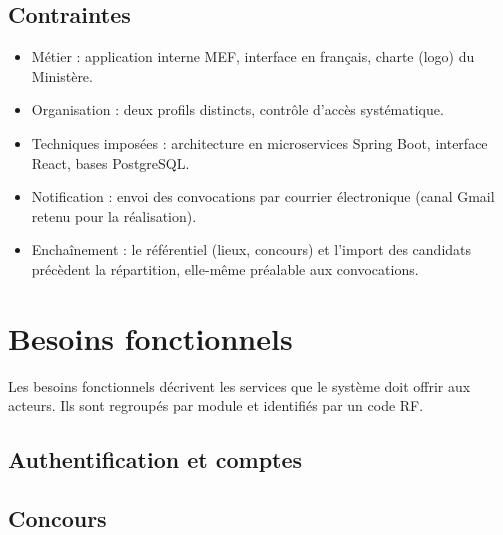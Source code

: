 \begin{onehalfspace}
\subsection{Contraintes}

\begin{itemize}
  \item Métier : application interne MEF, interface en français, charte (logo) du Ministère.
  \item Organisation : deux profils distincts, contrôle d'accès systématique.
  \item Techniques imposées : architecture en microservices Spring Boot, interface React, bases PostgreSQL.
  \item Notification : envoi des convocations par courrier électronique (canal Gmail retenu pour la réalisation).
  \item Enchaînement : le référentiel (lieux, concours) et l'import des candidats précèdent la répartition, elle-même préalable aux convocations.
\end{itemize}

\section{Besoins fonctionnels}

Les besoins fonctionnels décrivent les services que le système doit offrir aux acteurs. Ils sont regroupés par module et identifiés par un code RF.

\subsection{Authentification et comptes}


\subsection{Concours}


\end{onehalfspace}
